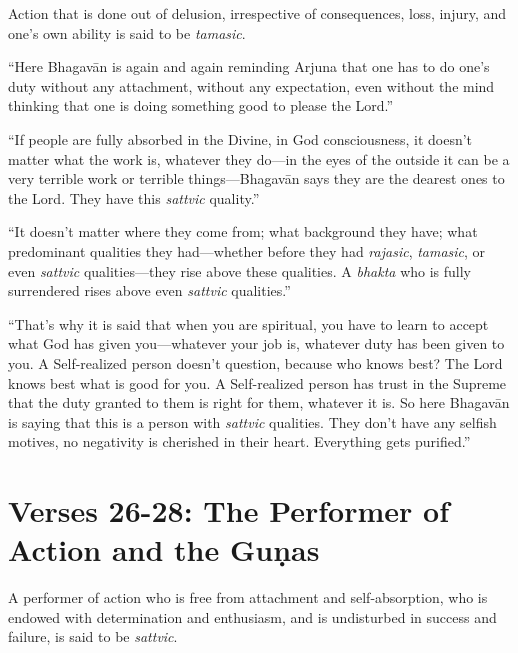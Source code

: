 {Action that is done out of delusion, irrespective of consequences, loss, injury, and one's own ability is said to be \textit{tamasic}.}

\enquote{Here Bhagavān is again and again reminding Arjuna that one has to do one’s duty without any attachment, without any expectation, even without the mind thinking that one is doing something good to please the Lord.}

\enquote{If people are fully absorbed in the Divine, in God consciousness, it doesn’t matter what the work is, whatever they do---in the eyes of the outside it can be a very terrible work or terrible things---Bhagavān says they are the dearest ones to the Lord. They have this \textit{sattvic} quality.}

\enquote{It doesn’t matter where they come from; what background they have; what predominant qualities they had---whether before they had \textit{rajasic}, \textit{tamasic}, or even \textit{sattvic} qualities---they rise above these qualities. A \textit{bhakta} who is fully surrendered rises above even \textit{sattvic} qualities.}

\enquote{That’s why it is said that when you are spiritual, you have to learn to accept what God has given you---whatever your job is, whatever duty has been given to you. A Self-realized person doesn’t question, because who knows best? The Lord knows best what is good for you. A Self-realized person has trust in the Supreme that the duty granted to them is right for them, whatever it is. So here Bhagavān is saying that this is a person with \textit{sattvic} qualities. They don’t have any selfish motives, no negativity is cherished in their heart. Everything gets purified.}

\section{Verses 26-28: The Performer of Action and the Guṇas}\label{sec-verses-26-28-the-performer-of-action-and-the-gunas}

{A performer of action who is free from attachment and self-absorption, who is endowed with determination and enthusiasm, and is undisturbed in success and failure, is said to be \textit{sattvic}.}

